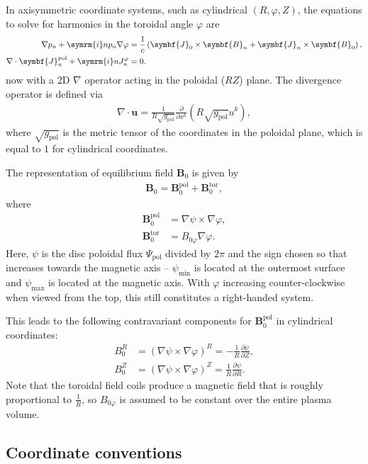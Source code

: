 \documentclass[a4paper, twoside, 10pt, english]{article}
\numberwithin{equation}{section}
\let\temp\varrho
\let\varrho\rho
\let\rho\temp
\let\temp\vartheta
\let\vartheta\theta
\let\theta\temp
\let\temp\varphi
\let\varphi\phi
\let\phi\temp
\let\vec\symbf
\newcommand*\grad{\ensuremath{\nabla}}
\newcommand*\divg{\ensuremath{\nabla \cdot}}
\newcommand*\im{\ensuremath{\symrm{i}}}  %
\newcommand*\pd[2][]{\ensuremath{\frac{\partial #1}{\partial #2}}}  %
\newcommand*\pol{\ensuremath{\textrm{pol}}}  %
\newcommand*\tor{\ensuremath{\textrm{tor}}}  %
\begin{document}
In axisymmetric coordinate systems, such as cylindrical $(R, \phi, Z)$, the equations to solve for harmonics in the toroidal angle $\phi$ are
\begin{align}
  \grad p_{n} + \im n p_{n} \grad \phi &= \frac{1}{c} \left( \vec{J}_{0} \times \vec{B}_{n} + \vec{J}_{n} \times \vec{B}_{0} \right), \label{eq:mhd-phi} \\
  \divg \vec{J}_{n}^{\pol}+ \im n J_{n}^{\phi} &= 0. \label{eq:divfree-phi}
\end{align}
now with a 2D $\grad$ operator acting in the poloidal ($RZ$) plane. The divergence operator is defined via
\begin{gather*}
  \divg \vec{u} = \frac{1}{R \sqrt{g_{\pol}}} \pd{x^{k}} (R \sqrt{g_{\pol}} u^{k}),
\end{gather*}
where $\sqrt{g_{\pol}}$ is the metric tensor of the coordinates in the poloidal plane, which is equal to $1$ for cylindrical coordinates.

The representation of equilibrium field $\vec{B}_{0}$ is given by
\begin{gather}
  \vec{B}_{0} = \vec{B}_{0}^{\pol} + \vec{B}_{0}^{\tor},
\end{gather}
where 
\begin{align}
  \vec{B}_{0}^{\pol} &= \grad \psi \times \grad \phi, \\
  \vec{B}_{0}^{\tor} &= B_{0 \phi} \grad \phi.
\end{align}
Here, $\psi$ is the disc poloidal flux $\Psi_{\pol}$ divided by $2 \pi$ and the sign chosen so that increases towards the magnetic axis -- $\psi_{\text{min}}$ is located at the outermost surface and $\psi_{\text{max}}$ is located at the magnetic axis. With $\phi$ increasing counter-clockwise when viewed from the top, this still constitutes a right-handed system.

This leads to the following contravariant components for $\vec{B}_{0}^{\pol}$ in cylindrical coordinates:
\begin{align}
  B_{0}^{R} &= (\grad \psi \times \grad \phi)^{R} = -\frac{1}{R} \pd[\psi]{Z}, \\
  B_{0}^{Z} &= (\grad \psi \times \grad \phi)^{Z} = \frac{1}{R} \pd[\psi]{R}.
\end{align}
Note that the toroidal field coils produce a magnetic field that is roughly proportional to $\frac{1}{R}$, so $B_{0 \phi}$ is assumed to be constant over the entire plasma volume.

\subsection{Coordinate conventions}
\label{sec:cocos}
\end{document}
